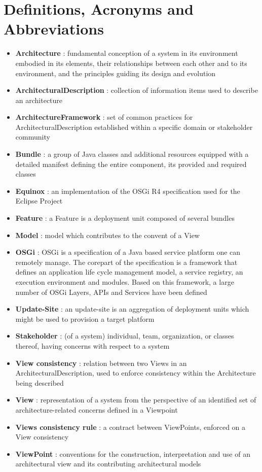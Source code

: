 \documentclass{gemoc} %
\begin{document}
\section{Definitions, Acronyms and Abbreviations}
\begin{itemize}
	\item \textbf{Architecture}  : fundamental conception of a system in its environment
 embodied in its elements, their relationships between each other and to its 
environment, and the principles guiding its design and evolution
	\item \textbf{ArchitecturalDescription} : collection of information items used to describe an architecture
	\item \textbf{ArchitectureFramework} : set of common practices for ArchitecturalDescription established within a specific domain or stakeholder community
	\item \textbf{Bundle} : a group of Java classes and additional resources equipped with a detailed manifest defining the entire component, its provided and required classes
	\item \textbf{Equinox} : an implementation of the OSGi R4 specification used for the Eclipse Project
	\item \textbf{Feature} : a Feature is a deployment unit composed of several bundles
	\item \textbf{Model} : model which contributes to the convent of a View
	\item \textbf{OSGi} : OSGi is a specification of a Java based service platform one can remotely manage. The corepart of the specification is a framework that defines an application life cycle management model, a service registry, an execution environment and modules. Based on this framework, a large number of OSGi Layers, APIs and Services have been defined
	\item \textbf{Update-Site} : an update-site is an aggregation of deployment units which might be used to provision a target platform
	\item \textbf{Stakeholder} : (of a system) individual, team, organization, or classes thereof, having concerns with respect to a system 
	\item \textbf {View consistency} : relation between two Views in an ArchitecturalDescription, used to enforce consistency within the Architecture being described
	\item \textbf{View} : representation of a system from the perspective of an identified set of architecture-related concerns defined in a Viewpoint
	\item \textbf{Views consistency rule} : a contract between ViewPoints, enforced on a View consistency
	\item \textbf{ViewPoint} : conventions for the construction, interpretation and use of an architectural view and its contributing architectural models
\end{itemize}
\end{document}
